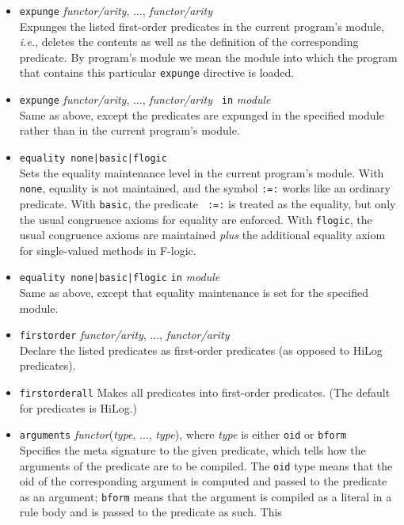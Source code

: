 \documentclass[11pt]{article}
\newcommand{\fl}{\mbox{F-logic}\xspace}
\begin{document}
\begin{itemize}
\item {\tt expunge} {\em functor/arity}, ..., {\em functor/arity}
  \\
  Expunges the listed first-order predicates in the current program's
  module, {\it i.e.}, deletes the contents as well as the definition of the
  corresponding predicate. By program's module we mean the module into
  which the program that contains this particular {\tt expunge} directive
  is loaded.
\item {\tt expunge} {\em functor/arity}, ..., {\em functor/arity} {\tt
    in} \emph{module}\\
  Same as above, except the predicates are expunged in the specified
    module rather than in the current program's module.
  \item {\tt equality none|basic|flogic}
    \\
    Sets the equality maintenance level in the current program's module.
    With {\tt none}, equality is not maintained, and the symbol {\tt :=:}
    works like an ordinary predicate.  With {\tt basic}, the predicate {\tt
      :=:} is treated as the equality, but only the usual congruence axioms
    for equality are enforced. With {\tt flogic}, the usual congruence
    axioms are maintained \emph{plus} the additional equality axiom for
    single-valued methods in \fl.
\item {\tt equality none|basic|flogic} {\tt in}  \emph{module}
  \\
  Same as above, except that equality maintenance is set for the specified
  module.
\item {\tt firstorder} {\em functor/arity}, ..., {\em functor/arity}
  \\
  Declare the listed predicates as first-order predicates (as opposed to HiLog
  predicates).
\item {\tt firstorderall}
  Makes all predicates into first-order predicates. (The default for predicates
  is HiLog.)
\item {\tt arguments} \emph{functor}(\emph{type}, ..., \emph{type}), where
  \emph{type} is either {\tt oid} or {\tt bform}
  \\
  Specifies the meta signature to the given predicate, which tells how the
  arguments of the predicate are to be compiled. The {\tt oid} type means
  that the oid of the corresponding argument is computed and passed to the
  predicate as an argument; {\tt bform} means that the argument is compiled
  as a literal in a rule body and is passed to the predicate as such. This

\end{itemize}
\end{document}
